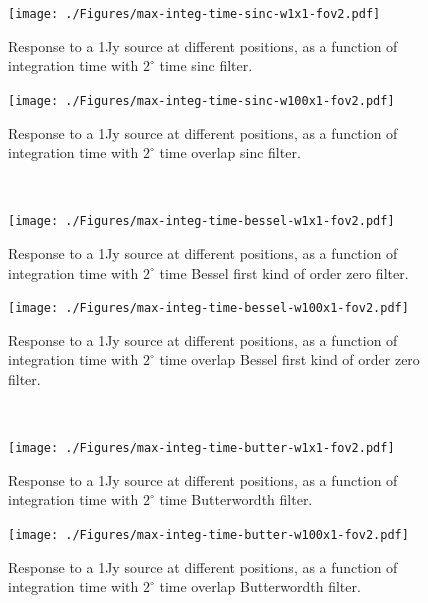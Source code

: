 \documentclass[useAMS,usenatbib]{mn2e}
\begin{document}
\begin{figure}
  \centering
\begin{minipage}{0.38\linewidth}\texttt{[image: ./Figures/max-integ-time-sinc-w1x1-fov2.pdf]}
	\caption{Response to a 1Jy source at different positions, as a function of integration time with $2^{\circ}$ time sinc filter.}
	\label{fig:max-integ-time-sinc-w1x1-fov2}
	\end{minipage} \hspace{1cm}
\begin{minipage}{0.38\linewidth}\texttt{[image: ./Figures/max-integ-time-sinc-w100x1-fov2.pdf]}
        \caption{Response to a 1Jy source at different positions, as a function of integration time with $2^{\circ}$ time overlap sinc 
filter.}
      \label{fig:max-integ-time-sinc-w100x1-fov2}
      \end{minipage}\\
\begin{minipage}{0.38\linewidth}\texttt{[image: ./Figures/max-integ-time-bessel-w1x1-fov2.pdf]}
    \caption{Response to a 1Jy source at different positions, as a function of integration time with $2^{\circ}$ time Bessel first kind of 
order zero
filter.}
    \label{fig:max-integ-time-bessel-w1x1-fov2}
    \end{minipage} 
 \hspace{1cm}
\begin{minipage}{0.38\linewidth}\texttt{[image: ./Figures/max-integ-time-bessel-w100x1-fov2.pdf]}
    \caption{Response to a 1Jy source at different positions, as a function of integration time with $2^{\circ}$ time overlap 
      Bessel first kind of order zero filter.}
    \label{fig:max-integ-time-bessel-w100x1-fov2}\end{minipage}\\
\begin{minipage}{0.38\linewidth}\texttt{[image: ./Figures/max-integ-time-butter-w1x1-fov2.pdf]}
    \caption{Response to a 1Jy source at different positions, as a function of integration time with $2^{\circ}$ time Butterwordth 
filter.}
    \label{fig:max-integ-time-butter-w1x1-fov2}
    \end{minipage} 
 \hspace{1cm}
\begin{minipage}{0.38\linewidth}\texttt{[image: ./Figures/max-integ-time-butter-w100x1-fov2.pdf]}
    \caption{Response to a 1Jy source at different positions, as a function of integration time with $2^{\circ}$ time overlap 
      Butterwordth filter.}
    \label{fig:max-integ-time-butter-w100x1-fov2}\end{minipage}   
\end{figure}
\end{document}
